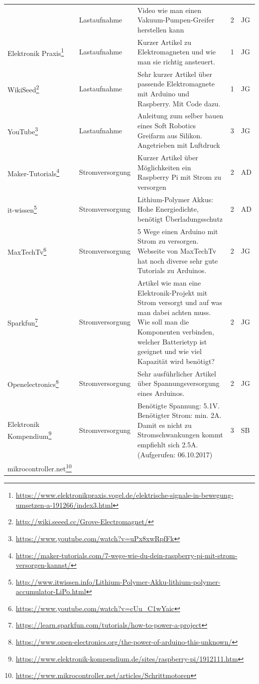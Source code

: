\documentclass[a4paper,11pt]{scrartcl}
\begin{document}
\begin{landscape}
{\begin{longtable}{|p{4cm}|p{4cm}|p{12cm}|l|l|}
& Lastaufnahme
& Video wie man einen Vakuum-Pumpen-Greifer herstellen kann
& 2 
& JG \\
Elektronik Praxis\footnote{\url{https://www.elektronikpraxis.vogel.de/elektrische-signale-in-bewegung-umsetzen-a-191266/index3.html}}
& Lastaufnahme
& Kurzer Artikel zu Elektromagneten und wie man sie richtig ansteuert.
& 1 
& JG \\
WikiSeed\footnote{\url{http://wiki.seeed.cc/Grove-Electromagnet/}}
& Lastaufnahme
& Sehr kurzer Artikel über passende Elektromagnete mit Arduino und Raspberry. Mit Code dazu.
& 1 
& JG \\
YouTube\footnote{\url{https://www.youtube.com/watch?v=uPx8xwRpfFk}}
& Lastaufnahme
& Anleitung zum selber bauen eines Soft Robotics Greifarm aus Silikon. Angetrieben mit Luftdruck
& 3 
& JG \\
Maker-Tutorials\footnote{\url{https://maker-tutorials.com/7-wege-wie-du-dein-raspberry-pi-mit-strom-versorgen-kannst/}}
& Stromversorgung
& Kurzer Artikel über Möglichkeiten ein Raspberry Pi mit Strom zu versorgen
& 2 
& AD \\
it-wissen\footnote{\url{http://www.itwissen.info/Lithium-Polymer-Akku-lithium-polymer-accumulator-LiPo.html}}
& Stromversorgung
& Lithium-Polymer Akkus: Hohe Energiedichte, benötigt Überladungsschutz
& 2 
& AD \\
MaxTechTv\footnote{\url{https://www.youtube.com/watch?v=cUu_C1wYaic}}
& Stromversorgung
& 5 Wege einen Arduino mit Strom zu versorgen. Webseite von MaxTechTv hat noch diverse sehr gute Tutorials zu Arduinos.
& 2 
& JG \\
Sparkfun\footnote{\url{https://learn.sparkfun.com/tutorials/how-to-power-a-project}}
& Stromversorgung
& Artikel wie man eine Elektronik-Projekt mit Strom versorgt und auf was man dabei achten muss. Wie soll man die Komponenten verbinden, welcher Batterietyp ist geeignet und wie viel Kapazität wird benötigt?
& 2 
& JG \\
Openelectronics\footnote{\url{https://www.open-electronics.org/the-power-of-arduino-this-unknown/}}
& Stromversorgung
& Sehr ausführlicher Artikel über Spannungsversorgung eines Arduinos.
& 2 
& JG \\
Elektronik Kompendium\footnote{\url{https://www.elektronik-kompendium.de/sites/raspberry-pi/1912111.htm}}
& Stromversorgung
& Benötigte Spannung: 5.1V. Benötigter Strom: min. 2A. Damit es nicht zu Stromschwankungen kommt empfiehlt sich 2.5A. (Aufgerufen: 06.10.2017)
& 3 
& SB \\
mikrocontroller.net\footnote{\url{https://www.mikrocontroller.net/articles/Schrittmotoren}}

\end{longtable}}
\end{landscape}
\end{document}
